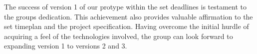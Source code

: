 The success of version 1 of our protype within the set deadlines is testament to the groups
dedication. This achievement also provides valuable affirmation to the set timeplan and the project 
specification. Having overcome the initial hurdle of acquiring a feel of the technologies involved,
the group can look forward to expanding version 1 to versions 2 and 3.